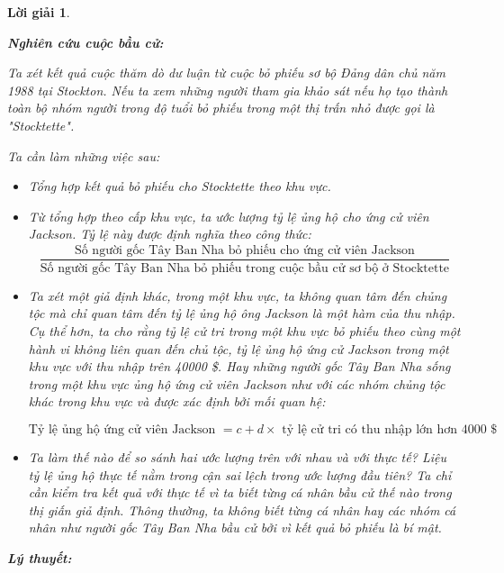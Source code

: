 \documentclass[14pt, a4paper]{article}
\theoremstyle{sltheorem}
\theoremstyle{soltheorem}
\newtheorem*{loigiai}{Lời giải}
\begin{document}
\begin{loigiai}
\begin{enumerate}
        \textbf{Nghiên cứu cuộc bầu cử:}

        Ta xét kết quả cuộc thăm dò dư luận từ cuộc bỏ phiếu sơ bộ Đảng dân chủ năm 1988 tại Stockton.
        Nếu ta xem những người tham gia khảo sát nếu họ tạo thành toàn bộ nhóm người trong độ tuổi bỏ phiếu trong một thị trấn nhỏ được gọi là "Stocktette".

        Ta cần làm những việc sau:

        \begin{itemize}
            \item Tổng hợp kết quả bỏ phiếu cho Stocktette theo khu vực.
            \item Từ tổng hợp theo cấp khu vực, ta ước lượng tỷ lệ ủng hộ cho ứng cử viên Jackson. Tỷ lệ này được định nghĩa theo công thức:
            \begin{equation*}
                \dfrac{\text{Số người gốc Tây Ban Nha bỏ phiếu cho ứng cử viên Jackson}}{\text{Số người gốc Tây Ban Nha bỏ phiếu trong cuộc bầu cử sơ bộ ở Stocktette}}
            \end{equation*}
            \item Ta xét một giả định khác, trong một khu vực, ta không quan tâm đến chủng tộc mà chỉ quan tâm đến tỷ lệ ủng hộ ông Jackson là một hàm của thu nhập.
            Cụ thể hơn, ta cho rằng tỷ lệ cử tri trong một khu vực bỏ phiếu theo cùng một hành vi không liên quan đến chủ tộc, tỷ lệ ủng hộ ứng cử Jackson trong một khu vực với thu nhập trên 40000 \$.
            Hay những người gốc Tây Ban Nha sống trong một khu vực ủng hộ ứng cử viên Jackson như với các nhóm chủng tộc khác trong khu vực và được xác định bởi mối quan hệ:

            \begin{equation*}
                \text{Tỷ lệ ủng hộ ứng cử viên Jackson } = c + d \times \text{ tỷ lệ cử tri có thu nhập lớn hơn 4000 \$}
            \end{equation*}
            \item Ta làm thế nào để so sánh hai ước lượng trên với nhau và với thực tế?
            Liệu tỷ lệ ủng hộ thực tế nằm trong cận sai lệch trong ước lượng đầu tiên?
            Ta chỉ cần kiểm tra kết quả với thực tế vì ta biết từng cá nhân bầu cử thế nào trong thị giấn giả định.
            Thông thường, ta không biết từng cá nhân hay các nhóm cá nhân như người gốc Tây Ban Nha bầu cử bởi vì kết quả bỏ phiếu là bí mật.
        \end{itemize}

        \textbf{Lý thuyết:}


\end{enumerate}
\end{loigiai}
\end{document}
